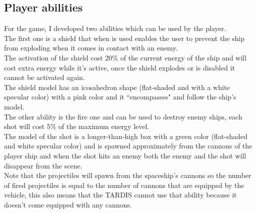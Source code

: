 \documentclass[a4paper,11pt]{article}
\begin{document}
\subsection{Player abilities}
For the game, I developed two abilities which can be used by the player.\\
The first one is a shield that when is used enables the user to prevent the ship from exploding when it comes in contact with an enemy.\\
The activation of the shield cost 20\% of the current energy of the ship and will cost extra energy while it's active, once the shield explodes or is disabled it cannot be activated again.\\
The shield model has an icosahedron shape (flat-shaded and with a white specular color) with a pink color and it ``encompasses" and follow the ship's model.\\
The other ability is the fire one and can be used to destroy enemy ships, each shot will cost 5\% of the maximum energy level.\\
The model of the shot is a longer-than-high box with a green color (flat-shaded and white specular color) and is spawned approximately from the cannons of the player ship and when the shot hits an enemy both the enemy and the shot will disappear from the scene.\\
Note that the projectiles will spawn from the spaceship's cannons so the number of fired projectiles is equal to the number of cannons that are equipped by the vehicle, this also means that the TARDIS cannot use that ability because it doesn't come equipped with any cannons.
\end{document}
